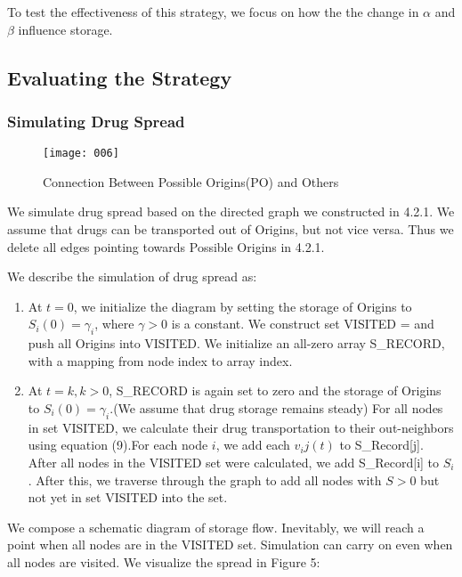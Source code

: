 To test the effectiveness of this strategy, we focus on how the the change in $\alpha$ and $\beta$ influence storage.

\subsection{Evaluating the Strategy}
\subsubsection{Simulating Drug Spread}

\begin{wrapfigure}[13]{r}{0.2\linewidth} %
	\begin{center}
		\texttt{[image: 006]}
	\end{center}
	\caption{Connection Between Possible Origins(PO) and Others}
\end{wrapfigure}

We simulate drug spread based on the directed graph we constructed in 4.2.1. We assume that drugs can be transported out of Origins, but not vice versa. Thus we delete all edges pointing towards Possible Origins in 4.2.1. 

We describe the simulation of drug spread as:

\begin{enumerate}[(1)]
	\item At $t=0$, we initialize the diagram by setting the storage of Origins to $S_i(0)=\gamma_i$, where $\gamma>0$ is a constant. We construct set VISITED = {} and push all Origins into VISITED. We initialize an all-zero array S\_RECORD, with a mapping from node index to array index.
	
	\item At $t=k, k>0$, S\_RECORD is again set to zero and the storage of Origins to $S_i(0)=\gamma_i$.(We assume that drug storage remains steady) For all nodes in set VISITED, we calculate their drug transportation to their out-neighbors using equation (9).For each node $i$, we add each $v_ij(t)$ to S\_Record[j]. After all nodes in the VISITED set were calculated, we add S\_Record[i] to $S_i$. After this, we traverse through the graph to add all nodes with $S>0$ but not yet in set VISITED into the set. 

\end{enumerate}

We compose a schematic diagram of storage flow. Inevitably, we will reach a point when all nodes are in the VISITED set. Simulation can carry on even when all nodes are visited. We visualize the spread in Figure 5:

